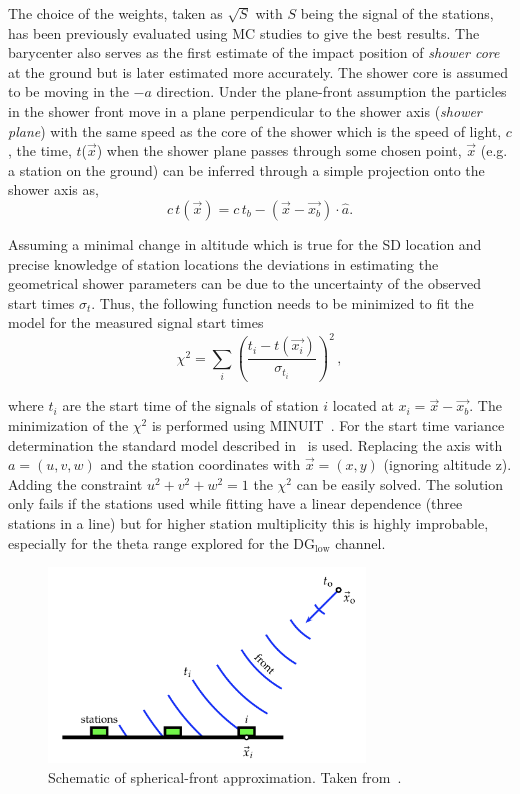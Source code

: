 The choice of the weights, taken as $\sqrt{S} $ with $S$ being the signal of the stations, has been previously evaluated using MC studies to give the best results. The barycenter also serves as the first estimate of the impact position of \textit{shower core} at the ground but is later estimated more accurately. The shower core is assumed to be moving in the $-a$ direction. Under the plane-front assumption the particles in the shower front move in a plane perpendicular to the shower axis (\textit{shower plane}) with the same speed as the core of the shower which is the speed of light, $c$, the time, $t$($\vec{x}$) when the shower plane passes through some chosen point, $\vec{x}$ (e.g. a station on the ground) can be inferred through a simple projection onto the shower axis as,
\begin{equation}
  c\,t(\vec{x}) = c\,t_b - (\vec{x}-\vec{x_b})\cdot \hat{a}.
\end{equation}

Assuming a minimal change in altitude which is true for the SD location and precise knowledge of station locations the deviations in estimating the geometrical shower parameters can be due to the uncertainty of the observed start times $\sigma_t$. Thus, the following function needs to be minimized to fit the model for the measured signal start times 
\begin{equation}
  \chi^2 = \sum_{i} \left(\frac{t_i - t(\vec{x_i})}{\sigma_{t_{i}}}\right)^2\, ,
\end{equation}

where $t_i$ are the start time of the signals of station $i$ located at $x_i = \vec{x} - \vec{x_b}$. The minimization of the $\chi^2$ is performed using MINUIT~\cite{James:1975dr}. For the start time variance determination the standard model described in~\cite{PierreAuger:2020yab} is used. Replacing the axis with $a =(u,v,w)$ and the station coordinates with $\vec{x} = (x,y)$ (ignoring altitude z). Adding the constraint $u^2 + v^2 + w^2 = 1$ the $\chi^2$ can be easily solved. The solution only fails if the stations used while fitting have a linear dependence (three stations in a line) but for higher station multiplicity this is highly improbable, especially for the theta range explored for the DG$\mathrm{_{low}}$ channel.

\begin{figure}[h!]
  \centering
  \includegraphics[width=0.75\textwidth]{thesis_figures/Nu_analysis/Spherical_fit.png}
  \caption{Schematic of spherical-front approximation. Taken from~\cite{PierreAuger:2020yab}.}
  \label{fig:Spherical_fit}
\end{figure}

